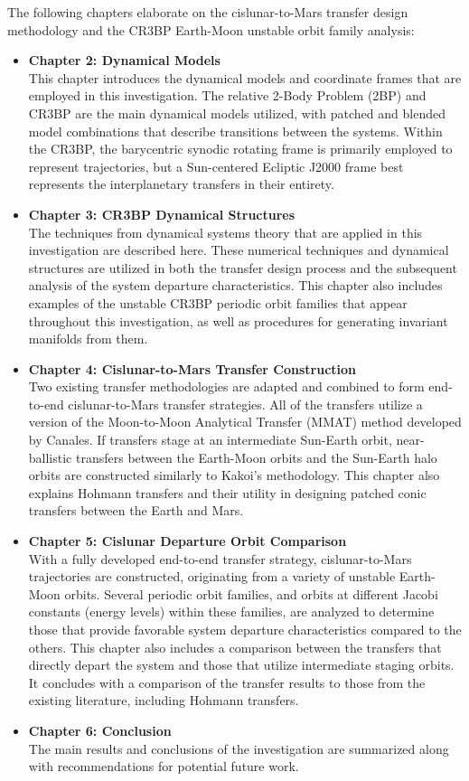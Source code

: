 The following chapters elaborate on the cislunar-to-Mars transfer design methodology and the CR3BP
Earth-Moon unstable orbit family analysis:
\begin{itemize}
	\item	\textbf{Chapter 2: Dynamical Models}\\
			This chapter introduces the dynamical models and coordinate frames that are employed in
			this investigation. The relative 2-Body Problem (2BP) and CR3BP are the main dynamical
			models utilized, with patched and blended model combinations that describe transitions
			between the systems. Within the CR3BP, the barycentric synodic rotating frame is
			primarily employed to represent trajectories, but a Sun-centered Ecliptic J2000 frame
			best represents the interplanetary transfers in their entirety.
	\item	\textbf{Chapter 3: CR3BP Dynamical Structures}\\
			The techniques from dynamical systems theory that are applied in this investigation are
			described here. These numerical techniques and dynamical structures are utilized in
			both the transfer design process and the subsequent analysis of the system departure
			characteristics. This chapter also includes examples of the unstable CR3BP periodic
			orbit families that appear throughout this investigation, as well as procedures for
			generating invariant manifolds from them.
	\item	\textbf{Chapter 4: Cislunar-to-Mars Transfer Construction}\\
			Two existing transfer methodologies are adapted and combined to form end-to-end
			cislunar-to-Mars transfer strategies. All of the transfers utilize a version of the
			Moon-to-Moon Analytical Transfer (MMAT) method developed by
			Canales\cite{Canales:2021b}. If transfers stage at an intermediate Sun-Earth orbit,
			near-ballistic transfers between the Earth-Moon orbits and the Sun-Earth halo orbits
			are constructed similarly to Kakoi's methodology\cite{Kakoi:2015}. This chapter also
			explains Hohmann transfers and their utility in designing patched conic transfers
			between the Earth and Mars.
	\item	\textbf{Chapter 5: Cislunar Departure Orbit Comparison}\\
			With a fully developed end-to-end transfer strategy, cislunar-to-Mars trajectories are
			constructed, originating from a variety of unstable Earth-Moon orbits. Several periodic
			orbit families, and orbits at different Jacobi constants (energy levels) within these
			families, are analyzed to determine those that provide favorable system departure
			characteristics compared to the others. This chapter also includes a comparison between
			the transfers that directly depart the system and those that utilize intermediate
			staging orbits. It concludes with a comparison of the transfer results to those from
			the existing literature, including Hohmann transfers.
	\item	\textbf{Chapter 6: Conclusion}\\
			The main results and conclusions of the investigation are summarized along with
			recommendations for potential future work.
\end{itemize}
